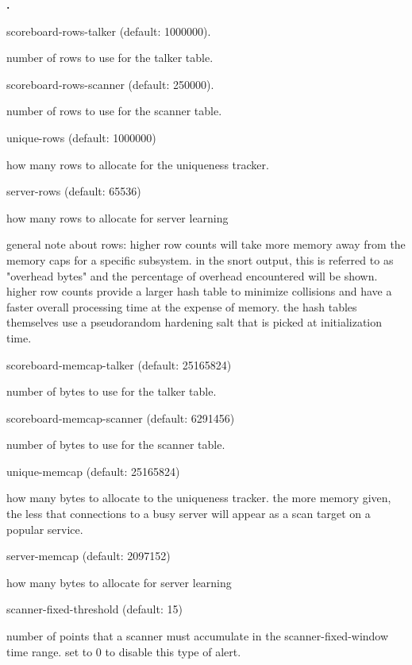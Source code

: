 \documentclass[english]{report}
\newcounter{slistnum}
\newenvironment{slist}{
    \begin{list}{
        {
            \bf \arabic{slistnum}.
        } 
    }{
        \usecounter{slistnum} 
    }
}{
    \end{list} 
}
\begin{document}
\begin{slist}
\item scoreboard-rows-talker (default: 1000000).

number of rows to use for the talker table.

\item scoreboard-rows-scanner (default: 250000).

number of rows to use for the scanner table.

\item unique-rows (default: 1000000)

how many rows to allocate for the uniqueness tracker.  

\item server-rows (default: 65536)

how many rows to allocate for server learning

general note about rows: higher row counts will take more memory away
from the memory caps for a specific subsystem.  in the snort output,
this is referred to as "overhead bytes" and the percentage of overhead
encountered will be shown.  higher row counts provide a larger hash
table to minimize collisions and have a faster overall processing time
at the expense of memory.  the hash tables themselves use a pseudorandom
hardening salt that is picked at initialization time.

\item scoreboard-memcap-talker (default: 25165824)

number of bytes to use for the talker table.
 
\item scoreboard-memcap-scanner (default: 6291456)

number of bytes to use for the scanner table.

\item unique-memcap (default: 25165824)

how many bytes to allocate to the uniqueness tracker. the more memory given,
the less that connections to a busy server will appear as a scan target on a
popular service. 

\item server-memcap (default: 2097152)

how many bytes to allocate for server learning

\item scanner-fixed-threshold (default: 15)

number of points that a scanner must accumulate in the scanner-fixed-window
time range.  set to 0 to disable this type of alert. 


\end{slist}
\end{document}
